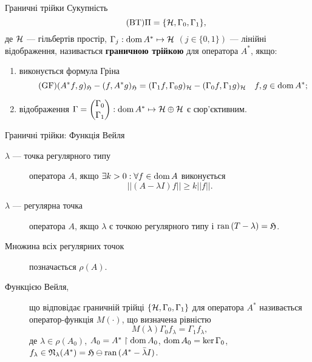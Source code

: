 

\begin{frame}{Граничні трійки}
	Сукупність
	\begin{equation} \label{BT}\tag{BT}
	 	\Pi = \{\mathcal{H}, \Gamma_0, \Gamma_1\},
	 \end{equation} 
	де $\mathcal{H}$ --- гільбертів простір, $\Gamma_j:\operatorname{dom}{A^*} \mapsto \mathcal{H}$ $(j\in \{0,1\})$ --- лінійні відображення, називається \textbf{граничною трійкою} для оператора $A^*$, якщо:
	\begin{enumerate}
		\item виконується формула Гріна
		\begin{equation}\label{eq-CS-Green}\tag{GF}
			(A^*f,g)_{\mathfrak{H}} - (f,A^*g)_{\mathfrak{H}} = (\Gamma_1f,\Gamma_0g)_{\mathcal{H}} - (\Gamma_0f,\Gamma_1g)_{\mathcal{H}} \quad f,g \in \operatorname{dom} A^*;
		\end{equation}
		\item  відображення $\Gamma = \dbinom{\Gamma_0}{\Gamma_1}: \operatorname{dom} A^* \mapsto \mathcal{H}\oplus\mathcal{H}$ є сюр'єктивним.
	\end{enumerate}
\end{frame}

\begin{frame}{Граничні трійки: Функція Вейля}
	\begin{description}
		\item [$\lambda$ --- точка регулярного типу] оператора $A$, якщо $\exists k>0:\forall f\in\operatorname{dom}{A}$ виконується $$||(A-\lambda I)f||\ge k||f||.$$
		\item [$\lambda$ --- регулярна точка] оператора $A$, якщо $\lambda$ є точкою регулярного типу і $\operatorname{ran}{(T-\lambda)}=\mathfrak{H}$.
		\item [Множина всіх регулярних точок] позначається $\rho(A)$.
		\item [Функцією Вейля,] що відповідає граничній трійці $\{\mathcal{H}, \Gamma_0, \Gamma_1\}$ для оператора $A^*$ називається оператор-функція $M(\cdot)$, що визначена рівністю
		\begin{equation} \tag{WF}
			M(\lambda)\Gamma_0f_\lambda = \Gamma_1f_\lambda,
		\end{equation}
		де $\lambda \in \rho(A_0)$, $A_0=A^*\upharpoonright\operatorname{dom}{A_0}$, $\operatorname{dom}{A_0}=\ker{\Gamma_0}$,\\
		$f_\lambda \in \mathfrak{N}_\lambda(A^*) = \mathfrak{H}\ominus\operatorname{ran}{(A^*-\bar{\lambda}I)}$.
	\end{description}
\end{frame}

